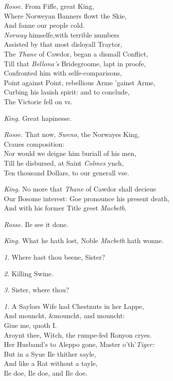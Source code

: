 \documentclass[12pt]{sides}
\newcommand{\dia}[1]{\hskip 10pt\textit{#1}\hskip 6pt}
\begin{document}
\begin{multicols}{2}
			\dia{Rosse.} From Fiffe, great King, \\ Where Norweyan Banners flowt the Skie, \\ And fanne our people cold. \\ \textit{Norway} himselfe,with terrible numbers \\ Assisted by that most disloyall Traytor, \\ The \textit{Thane} of Cawdor, began a dismall Conflict, \\ Till that \textit{Bellona's} Bridegroome, lapt in proofe, \\ Confronted him with selfe-comparisons, \\ Point against Point, rebellious Arme 'gainst Arme, \\ Curbing his lauish spirit: and to conclude, \\ The Victorie fell on vs.
			
			\dia{King.} Great hapinesse.
			
			\dia{Rosse.} That now, \textit{Sweno}, the Norwayes King, \\ Craues composition: \\ Nor would we deigne him buriall of his men, \\ Till he disbursed, at Saint \textit{Colmes} ynch, \\ Ten thousand Dollars, to our generall vse.
			
			\dia{King.} No more that \textit{Thane} of Cawdor shall decieue \\ Our Bosome interest: Goe pronounce his present death, \\ And with his former Title greet \textit{Macbeth}.
			
			\dia{Rosse.} Ile see it done.
			
			\dia{King.} What he hath lost, Noble \textit{Macbeth} hath wonne.
			\hfill {}
			
			
			\dia{1.} Where hast thou beene, Sister?
			
			\dia{2.} Killing Swine.
			
			\dia{3.} Sister, where thou?
			
			\dia{1.} A Saylors Wife had Chestnuts in her Lappe, \\ And mouncht, \&mouncht, and mouncht: \\ Giue me, quoth I. \\ Aroynt thee, Witch, the rumpe-fed Ronyon cryes. \\ Her Husband's to Aleppo gone, Master o'th'\textit{Tiger:} \\ But in a Syue Ile thither sayle, \\ And like a Rat without a tayle, \\ Ile doe, Ile doe, and Ile doe.
			

\end{multicols}
\end{document}
